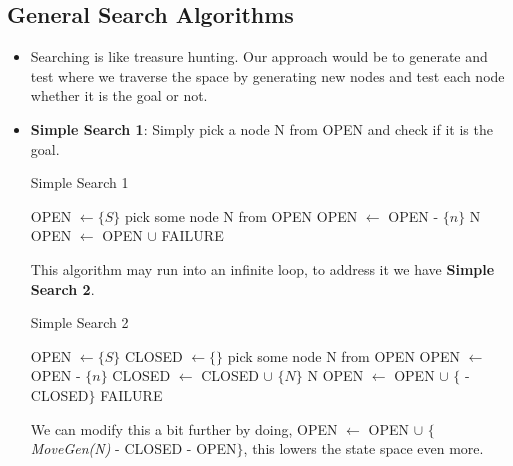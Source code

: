 \documentclass[a4paper]{article}
\begin{document}
\subsection{General Search Algorithms}
\begin{itemize}
    \item Searching is like treasure hunting. Our approach would be to generate and test where we traverse the space by generating new nodes and test each node whether it is the goal or not.
    \item \textbf{Simple Search 1}: Simply pick a node N from OPEN and check if it is the goal.
    \begin{algorithm}[H]
        \caption{Simple Search 1}\label{alg:AI-simple-search-1}
        \begin{algorithmic}[1]
            \State OPEN $\gets \{S\}$
                \State pick some node N from OPEN
                \State OPEN $\gets$ OPEN - $\{n\}$
                    \State \Return N
                \Else
                    \State OPEN $\gets$ OPEN $\cup$ 
                \EndIf
            \EndWhile
            \State \Return FAILURE
        \end{algorithmic}
    \end{algorithm}
    This algorithm may run into an infinite loop, to address it we have \textbf{Simple Search 2}.
    \begin{algorithm}[H]
        \caption{Simple Search 2}\label{alg:AI-simple-search-2}
        \begin{algorithmic}[1]
            \State OPEN $\gets \{S\}$
            \State CLOSED $\gets \{\}$ 
                \State pick some node N from OPEN
                \State OPEN $\gets$ OPEN - $\{n\}$
                \State CLOSED $\gets$ CLOSED $\cup$ $\{N\}$
                    \State \Return N
                \Else
                    \State OPEN $\gets$ OPEN $\cup$ $\{$ - CLOSED$\}$
                \EndIf
            \EndWhile
            \State \Return FAILURE
        \end{algorithmic}
    \end{algorithm}
    We can modify this a bit further by doing, OPEN $\gets$ OPEN $\cup$ $\{$\textit{MoveGen(N)} - CLOSED - OPEN$\}$, this lowers the state space even more.
\end{itemize}
\end{document}
